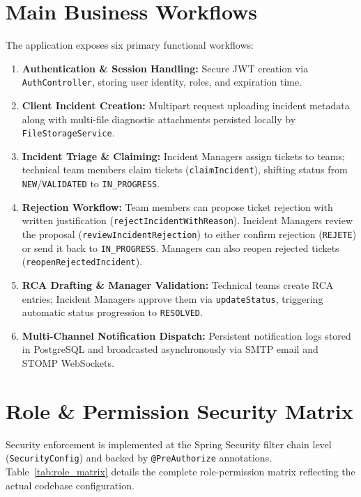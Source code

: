 \documentclass[12pt,a4paper]{report}
\begin{document}
\section{Main Business Workflows}
The application exposes six primary functional workflows:
\begin{enumerate}
    \item \textbf{Authentication \& Session Handling:} Secure JWT creation via \texttt{AuthController}, storing user identity, roles, and expiration time.
    \item \textbf{Client Incident Creation:} Multipart request uploading incident metadata along with multi-file diagnostic attachments persisted locally by \texttt{FileStorageService}.
    \item \textbf{Incident Triage \& Claiming:} Incident Managers assign tickets to teams; technical team members claim tickets (\texttt{claimIncident}), shifting status from \texttt{NEW}/\texttt{VALIDATED} to \texttt{IN\_PROGRESS}.
    \item \textbf{Rejection Workflow:} Team members can propose ticket rejection with written justification (\texttt{rejectIncidentWithReason}). Incident Managers review the proposal (\texttt{reviewIncidentRejection}) to either confirm rejection (\texttt{REJETE}) or send it back to \texttt{IN\_PROGRESS}. Managers can also reopen rejected tickets (\texttt{reopenRejectedIncident}).
    \item \textbf{RCA Drafting \& Manager Validation:} Technical teams create RCA entries; Incident Managers approve them via \texttt{updateStatus}, triggering automatic status progression to \texttt{RESOLVED}.
    \item \textbf{Multi-Channel Notification Dispatch:} Persistent notification logs stored in PostgreSQL and broadcasted asynchronously via SMTP email and STOMP WebSockets.
\end{enumerate}

\section{Role \& Permission Security Matrix}
Security enforcement is implemented at the Spring Security filter chain level (\texttt{SecurityConfig}) and backed by \texttt{@PreAuthorize} annotations. Table~\ref{tab:role_matrix} details the complete role-permission matrix reflecting the actual codebase configuration.
\end{document}
